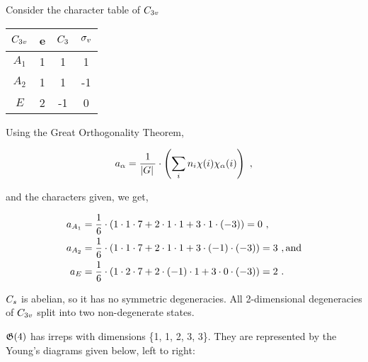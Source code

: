\begin{alphaparts}

    \questionpart 
    Consider the character table of $C_{3v}$

    \begin{center}
        \begin{tabular}[ht]{c | c c c}
            $C_{3v}$  &   e   &   $C_{3}$   &   $\sigma_v$ \\ \hline
            $A_1$           &   1   &   1               &   1               \\
            $A_2$           &   1   &   1               &   -1              \\
            $E$             &   2   &   -1              &   0               
        \end{tabular}
    \end{center}

    Using the Great Orthogonality Theorem,

    \begin{equation}
        a_\alpha = \frac{1}{\abs*{G}} \cdot \left( \sum_i n_i \chi(i) \chi_\alpha(i)\right)~,
    \end{equation}

    and the characters given, we get,

    \begin{align}
        a_{A_1} &= \frac{1}{6} \cdot \left( 1 \cdot 1 \cdot 7 + 2 \cdot 1 \cdot 1 + 3 \cdot 1 \cdot (-3)  \right) = 0~,\\
        a_{A_2} &= \frac{1}{6} \cdot \left( 1 \cdot 1 \cdot 7 + 2 \cdot 1 \cdot 1 + 3 \cdot (-1) \cdot (-3)  \right) = 3~, \textnormal{and}\\
        a_{E}   &= \frac{1}{6} \cdot \left( 1 \cdot 2 \cdot 7 + 2 \cdot (-1) \cdot 1 + 3 \cdot 0 \cdot (-3)  \right) = 2~.
    \end{align}

    \questionpart 
    $C_s$ is abelian, so it has no symmetric degeneracies. All 2-dimensional degeneracies
    of $C_{3v}$ split into two non-degenerate states.

    \setcounter{partCounter}{6} %

    \questionpart 
    $\mathfrak{G}(4)$ has irreps with dimensions \{1, 1, 2, 3, 3\}. They are represented by the Young's diagrams given 
    below, left to right:



\end{alphaparts}
